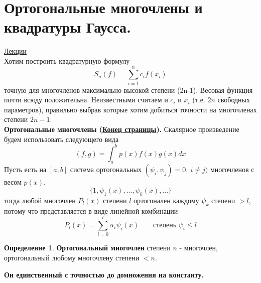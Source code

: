 \documentclass[specialist, subf, href, colorlinks=true, 12pt, times, mtpro, final]{disser}
\theoremstyle{definition}
\newtheorem{defn}{Определение}[section]
\begin{document}
\section {Ортогональные многочлены и квадратуры Гаусса.}
    \hyperlink {lects.40}{Лекции}\\
    Хотим построить квадратурную формулу
    $$
        S_n(f) = \sum\limits_{i = 1}^n c_i f(x_i)
    $$ 
    точную для многочленов максимально высокой степени (2n-1). Весовая функция почти всюду положительна. Неизвестными считаем и $c_i$ и  $x_i$ (т.е. $2n$ свободных параметров), правильно выбрав которые хотим добиться точности на многочленах степени $2n-1$. \\
    \textbf{Ортогональные многочлены (\hyperlink {lects.40}{Конец страницы}).}
    Скалярное произведение будем использовать следующего вида
    $$
        (f,g) = \int_a^b p(x)f(x)g(x) dx
    $$
    Пусть есть на $[a,b]$ система ортогональных $(\psi_i, \psi_j) = 0, \ i\ne j)$ многочленов с весом $p(x)$.
    $$
        \{1, \psi_1 (x), ..., \psi_k(x), ...\}
    $$
    тогда любой многочлен $P_l(x)$ степени $l$ ортогонален каждому $\psi_k$ степени $>l$, потому что представляется в виде линейной комбинации 
    $$
        P_l(x) = \sum\limits_{i = 0}^l \alpha_i \psi_i (x) \ \ \ \ \ \ \ \ \ \text{степень } \psi_i \le l
    $$
    \begin{defn}
        \textbf{Ортогональный многочлен} степени $n$ - многочлен, ортогональный любому многочлену степени $<n$.
    \end{defn}
    \textbf{Он единственный с точностью до домножения на константу.} \\
    
\end{document}

